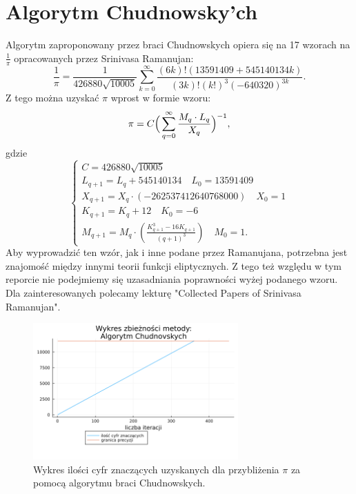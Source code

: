 \section{Algorytm Chudnowsky'ch}

Algorytm zaproponowany przez braci Chudnowskych opiera się na 17 wzorach na $\frac1\pi$ opracowanych przez Srinivasa Ramanujan\cite{review}:
$${\frac {1}{\pi }}={\frac {1}{426880{\sqrt {10005}}}}\sum _{k=0}^{\infty }{\frac {(6k)!(13591409+545140134k)}{(3k)!(k!)^{3}(-640320)^{3k}}}.$$
Z tego można uzyskać $\pi$ wprost w formie wzoru:
$$\pi=C\Big(\sum\limits_{q=0}^\infty{M_q\cdot L_q\over X_q}\Big)^{-1},$$
gdzie 
$$
\begin{cases}
    C=426880\sqrt{10005}\\
    L_{q+1}=L_q+545140134 \quad L_0=13591409  \\
    X_{q+1}=X_q\cdot(-262537412640768000)\quad X_0=1\\
    K_{q+1}=K_q+12\quad K_0=-6\\
    M_{q+1}=M_{q}\cdot \left({\frac {K_{q+1}^{3}-16K_{q+1}}{\left(q+1\right)^{3}}}\right)\quad M_{0}=1.
\end{cases}
$$
Aby wyprowadzić ten wzór, jak i inne podane przez Ramanujana, potrzebna jest znajomość między innymi teorii funkcji eliptycznych\cite{review}. Z tego też względu w tym reporcie nie podejmiemy się uzasadniania poprawności wyżej podanego wzoru. Dla zainteresowanych polecamy lekturę "Collected Papers of Srinivasa Ramanujan"\cite{ramanujan}.

\begin{figure}[!h]
    \centering
    \renewcommand{\figurename}{Wykres}
    \includegraphics[width=0.7\textwidth]{../prog/chudnowsky_log_error.png}
    \caption{Wykres ilości cyfr znaczących uzyskanych dla  przybliżenia  $\pi$ za pomocą algorytmu braci Chudnowskych.}
    \label{chudnowsky-error}
\end{figure}

